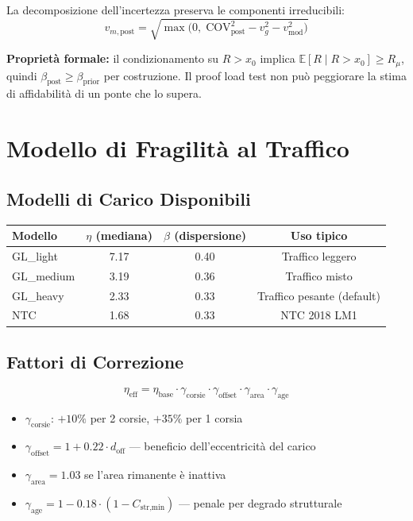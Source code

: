 \documentclass[11pt,a4paper]{article}
\begin{document}
La decomposizione dell'incertezza preserva le componenti irreducibili:
\begin{equation}
  v_{m,\text{post}} = \sqrt{\max\!\bigl(0,\; \text{COV}_{\text{post}}^2 - v_g^2 - v_{\text{mod}}^2\bigr)}
\end{equation}

\textbf{Propriet\`a formale:} il condizionamento su $R > x_0$ implica $\mathbb{E}[R\mid R>x_0] \geq R_\mu$, quindi $\beta_{\text{post}} \geq \beta_{\text{prior}}$ per costruzione. Il proof load test non pu\`o peggiorare la stima di affidabilit\`a di un ponte che lo supera.

\section{Modello di Fragilità al Traffico}

\subsection{Modelli di Carico Disponibili}

\begin{center}
\begin{tabular}{lccc}
\toprule
\textbf{Modello} & $\eta$ (mediana) & $\beta$ (dispersione) & \textbf{Uso tipico} \\
\midrule
GL\_light  & 7.17 & 0.40 & Traffico leggero \\
GL\_medium & 3.19 & 0.36 & Traffico misto \\
GL\_heavy  & 2.33 & 0.33 & Traffico pesante (default) \\
NTC        & 1.68 & 0.33 & NTC 2018 LM1 \\
\bottomrule
\end{tabular}
\end{center}

\subsection{Fattori di Correzione}

\begin{equation}
  \eta_{\text{eff}} = \eta_{\text{base}}
    \cdot \gamma_{\text{corsie}}
    \cdot \gamma_{\text{offset}}
    \cdot \gamma_{\text{area}}
    \cdot \gamma_{\text{age}}
\end{equation}

\begin{itemize}
  \item $\gamma_{\text{corsie}}$: $+10\%$ per 2 corsie, $+35\%$ per 1 corsia
  \item $\gamma_{\text{offset}} = 1 + 0.22 \cdot d_{\text{off}}$ --- beneficio dell'eccentricit\`a del carico
  \item $\gamma_{\text{area}} = 1.03$ se l'area rimanente \`e inattiva
  \item $\gamma_{\text{age}} = 1 - 0.18 \cdot (1 - C_{\text{str,min}})$ --- penale per degrado strutturale
\end{itemize}
\end{document}
